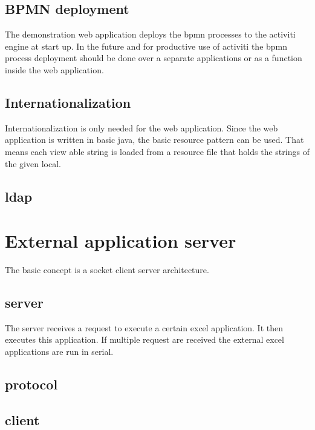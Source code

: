 \documentclass[paper=a4,twoside=false,BCOR=0mm,DIV=calc,fontsize=12pt]{scrartcl}
\begin{document}



\subsection{BPMN deployment}
The demonstration web application deploys the bpmn processes to the activiti engine at start up. In the future and for productive use of activiti the
bpmn process deployment should be done over a separate applications or as a function inside the web application. 


\subsection{Internationalization}
Internationalization is only needed for the web application. Since the web application is written in basic java, the basic resource pattern can be used. That means each view able string is loaded from a resource file that holds the strings of the given local. 



\subsection{ldap}



\section{External application server}

The basic concept is a socket client server architecture. 

\subsection{server}

The server receives a request to execute a certain excel application. It then executes this application. If multiple request are received the external excel applications are run in serial.


\subsection{protocol}


\subsection{client}
\end{document}
